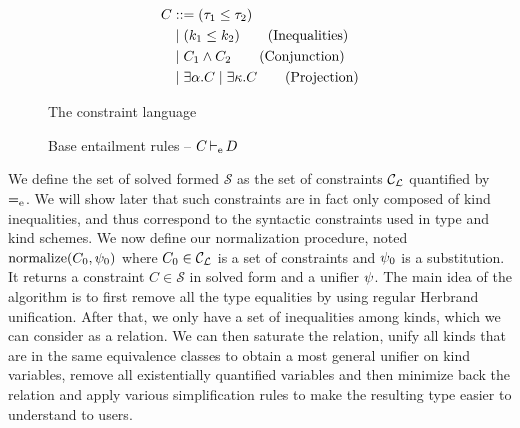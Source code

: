 \begin{figure}[!h]
  \centering
  \begin{minipage}{0.32\linewidth}
    \begin{align*}
      C &::= (\tau_1 \leq \tau_2) \\
        &\mid (k_1 \leq k_2) \tag{Inequalities} \\
        &\mid C_1 \wedge C_2  \tag{Conjunction}\\
        &\mid \exists \alpha.C 
        \mid \exists \kappa.C \tag{Projection} 
    \end{align*}
    \caption{The constraint language}
    \label{grammar:constraint}
  \end{minipage}\hfill
  \begin{minipage}{0.64\linewidth}
    \caption{Base entailment rules -- $C \operatorname{\vdash_e} D$ }
    \label{rules:entail}
  \end{minipage}
\end{figure}

We define the set of solved formed
$\mathcal S$ as the set of constraints ${\mathcal C_{\mathcal L}}$ quantified by $\operatorname{=_e}$.
We will show later that such constraints are in fact only composed of
kind inequalities, and thus correspond to the syntactic constraints
used in type and kind schemes.
%
We now define our normalization procedure, noted $\operatorname{normalize}(C_0,\mathrm{\psi}_0)$ where
$C_0\in {\mathcal C_{\mathcal L}}$ is a set of constraints and $\mathrm{\psi}_0$ is a substitution.
It returns a constraint $C \in \mathcal S$ in
solved form and a unifier $\mathrm{\psi}$.
The main idea of the algorithm is to first remove all the type equalities
by using regular Herbrand unification. After that, we only have
a set of inequalities among kinds, which we can consider as a relation.
We can then saturate the relation,
unify all kinds that are in the same equivalence classes to obtain
a most general unifier on kind variables,
remove all existentially quantified variables and
then minimize back the relation and apply various
simplification rules to make the resulting type easier to understand to users.

